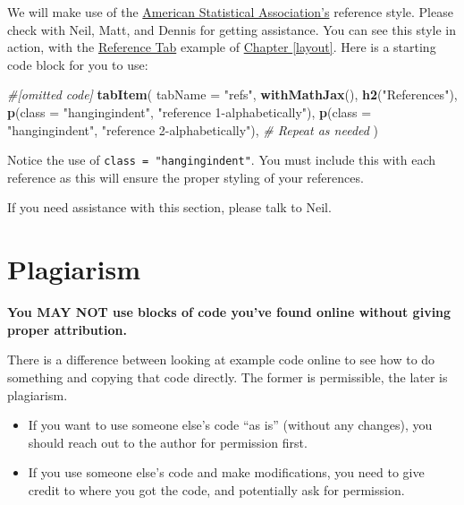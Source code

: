 \documentclass[
]{book}
\newenvironment{Shaded}{\begin{snugshade}}{\end{snugshade}}
\newcommand{\CommentTok}[1]{\textcolor[rgb]{0.56,0.35,0.01}{\textit{#1}}}
\newcommand{\DataTypeTok}[1]{\textcolor[rgb]{0.13,0.29,0.53}{#1}}
\newcommand{\KeywordTok}[1]{\textcolor[rgb]{0.13,0.29,0.53}{\textbf{#1}}}
\newcommand{\NormalTok}[1]{#1}
\newcommand{\StringTok}[1]{\textcolor[rgb]{0.31,0.60,0.02}{#1}}
\providecommand{\tightlist}{%
  \setlength{\itemsep}{0pt}\setlength{\parskip}{0pt}}
\begin{document}
We will make use of the \href{https://amstat.tfjournals.com/asa-style-guide/}{American Statistical Association's} reference style. Please check with Neil, Matt, and Dennis for getting assistance. You can see this style in action, with the \protect\hyperlink{refTab}{Reference Tab} example of \protect\hyperlink{layout}{Chapter \ref{layout}}. Here is a starting code block for you to use:

\begin{Shaded}
\begin{Highlighting}[]
\CommentTok{#[omitted code]}
\KeywordTok{tabItem}\NormalTok{(}
  \DataTypeTok{tabName =} \StringTok{"refs"}\NormalTok{,}
  \KeywordTok{withMathJax}\NormalTok{(),}
  \KeywordTok{h2}\NormalTok{(}\StringTok{"References"}\NormalTok{),}
  \KeywordTok{p}\NormalTok{(}\DataTypeTok{class =} \StringTok{"hangingindent"}\NormalTok{,}
    \StringTok{"reference 1-alphabetically"}\NormalTok{),}
  \KeywordTok{p}\NormalTok{(}\DataTypeTok{class =} \StringTok{"hangingindent"}\NormalTok{,}
    \StringTok{"reference 2-alphabetically"}\NormalTok{),}
  \CommentTok{# Repeat as needed}
\NormalTok{)}
\end{Highlighting}
\end{Shaded}

Notice the use of \texttt{class\ =\ "hangingindent"}. You must include this with each reference as this will ensure the proper styling of your references.

If you need assistance with this section, please talk to Neil.

\hypertarget{plagiarism}{%
\section{Plagiarism}\label{plagiarism}}

\textbf{You MAY NOT use blocks of code you've found online without giving proper attribution.}

There is a difference between looking at example code online to see how to do something and copying that code directly. The former is permissible, the later is plagiarism.

\begin{itemize}
\tightlist
\item
  If you want to use someone else's code ``as is'' (without any changes), you should reach out to the author for permission first.
\item
  If you use someone else's code and make modifications, you need to give credit to where you got the code, and potentially ask for permission.
\end{itemize}
\end{document}
